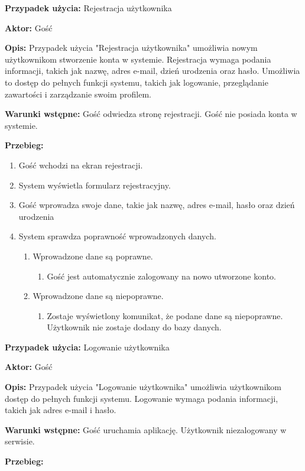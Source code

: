 \textbf{Przypadek użycia:} Rejestracja użytkownika

\textbf{Aktor:} Gość

\textbf{Opis:} Przypadek użycia "Rejestracja użytkownika" umożliwia nowym użytkownikom stworzenie konta w systemie. Rejestracja wymaga podania informacji, takich jak nazwę, adres e-mail, dzień urodzenia oraz hasło. Umożliwia to dostęp do pełnych funkcji systemu, takich jak logowanie, przeglądanie zawartości i zarządzanie swoim profilem.

\textbf{Warunki wstępne:} Gość odwiedza stronę rejestracji. Gość nie posiada konta w systemie.

\textbf{Przebieg:}

\begin{enumerate}
	\item Gość wchodzi na ekran rejestracji.
	\item System wyświetla formularz rejestracyjny.
	\item Gość wprowadza swoje dane, takie jak nazwę, adres e-mail, hasło oraz dzień urodzenia
	\item System sprawdza poprawność wprowadzonych danych.
	\begin{enumerate}
		\item Wprowadzone dane są poprawne.
		\begin{enumerate}
			\item Gość jest automatycznie zalogowany na nowo utworzone konto.
		\end{enumerate}
		\item Wprowadzone dane są niepoprawne.
		\begin{enumerate}
			\item Zostaje wyświetlony komunikat, że podane dane są niepoprawne. Użytkownik nie zostaje dodany do bazy danych.
		\end{enumerate}
	\end{enumerate}
\end{enumerate}


\textbf{Przypadek użycia:} Logowanie użytkownika

\textbf{Aktor:} Gość

\textbf{Opis:} Przypadek użycia "Logowanie użytkownika" umożliwia użytkownikom dostęp do
pełnych funkcji systemu. Logowanie wymaga podania informacji, takich jak adres e-mail
i hasło.

\textbf{Warunki wstępne:} Gość uruchamia aplikację. Użytkownik niezalogowany w serwisie.

\textbf{Przebieg:}


